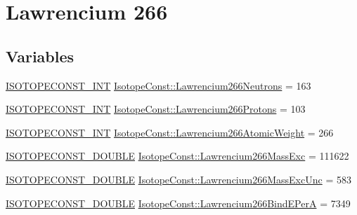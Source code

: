 \hypertarget{group___isotope_const-_lawrencium-_lr266}{}\section{Lawrencium 266}
\label{group___isotope_const-_lawrencium-_lr266}
\subsection*{Variables}
\begin{DoxyCompactItemize}
\item 
\mbox{\hyperlink{group___isotope_const-_macros_ga5f18360b3e99483a35c32d789e62621c}{I\+S\+O\+T\+O\+P\+E\+C\+O\+N\+S\+T\+\_\+\+I\+NT}} \mbox{\hyperlink{group___isotope_const-_lawrencium-_lr266_gafdfaa5a2ad200c701c766db65876ff62}{Isotope\+Const\+::\+Lawrencium266\+Neutrons}} = 163
\item 
\mbox{\hyperlink{group___isotope_const-_macros_ga5f18360b3e99483a35c32d789e62621c}{I\+S\+O\+T\+O\+P\+E\+C\+O\+N\+S\+T\+\_\+\+I\+NT}} \mbox{\hyperlink{group___isotope_const-_lawrencium-_lr266_ga63227f1cb92f700365effb06707a8ad9}{Isotope\+Const\+::\+Lawrencium266\+Protons}} = 103
\item 
\mbox{\hyperlink{group___isotope_const-_macros_ga5f18360b3e99483a35c32d789e62621c}{I\+S\+O\+T\+O\+P\+E\+C\+O\+N\+S\+T\+\_\+\+I\+NT}} \mbox{\hyperlink{group___isotope_const-_lawrencium-_lr266_gae1cf6709b97e10707717ebcb8e586d38}{Isotope\+Const\+::\+Lawrencium266\+Atomic\+Weight}} = 266
\item 
\mbox{\hyperlink{group___isotope_const-_macros_ga8f45a7272ce02c0b4c65c44636ed719a}{I\+S\+O\+T\+O\+P\+E\+C\+O\+N\+S\+T\+\_\+\+D\+O\+U\+B\+LE}} \mbox{\hyperlink{group___isotope_const-_lawrencium-_lr266_ga39fbc394ea7240a71cf1c0f6aadb5c0a}{Isotope\+Const\+::\+Lawrencium266\+Mass\+Exc}} = 111622
\item 
\mbox{\hyperlink{group___isotope_const-_macros_ga8f45a7272ce02c0b4c65c44636ed719a}{I\+S\+O\+T\+O\+P\+E\+C\+O\+N\+S\+T\+\_\+\+D\+O\+U\+B\+LE}} \mbox{\hyperlink{group___isotope_const-_lawrencium-_lr266_ga693f146392011fd043065dc37195b46d}{Isotope\+Const\+::\+Lawrencium266\+Mass\+Exc\+Unc}} = 583
\item 
\mbox{\hyperlink{group___isotope_const-_macros_ga8f45a7272ce02c0b4c65c44636ed719a}{I\+S\+O\+T\+O\+P\+E\+C\+O\+N\+S\+T\+\_\+\+D\+O\+U\+B\+LE}} \mbox{\hyperlink{group___isotope_const-_lawrencium-_lr266_gaeacc7df659f4f21ac0a8f3402ad0aecb}{Isotope\+Const\+::\+Lawrencium266\+Bind\+E\+PerA}} = 7349
\item 

\end{DoxyCompactItemize}
